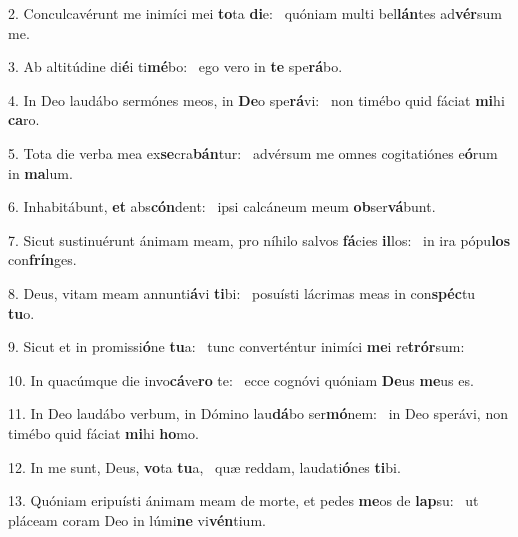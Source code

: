 2. Conculcavérunt me inimíci mei \textbf{to}ta \textbf{di}e: \ast\  quóniam multi bel\textbf{lán}tes ad\textbf{vér}sum me.\

3. Ab altitúdine di\textbf{é}i ti\textbf{mé}bo: \ast\  ego vero in \textbf{te} spe\textbf{rá}bo.\

4. In Deo laudábo sermónes meos, in \textbf{De}o spe\textbf{rá}vi: \ast\  non timébo quid fáciat \textbf{mi}hi \textbf{ca}ro.\

5. Tota die verba mea ex\textbf{se}cra\textbf{bán}tur: \ast\  advérsum me omnes cogitatiónes e\textbf{ó}rum in \textbf{ma}lum.\

6. Inhabitábunt, \textbf{et} abs\textbf{cón}dent: \ast\  ipsi calcáneum meum \textbf{ob}ser\textbf{vá}bunt.\

7. Sicut sustinuérunt ánimam meam, pro níhilo salvos \textbf{fá}cies \textbf{il}los: \ast\  in ira pópu\textbf{los} con\textbf{frín}ges.\

8. Deus, vitam meam annunti\textbf{á}vi \textbf{ti}bi: \ast\  posuísti lácrimas meas in con\textbf{spéc}tu \textbf{tu}o.\

9. Sicut et in promissi\textbf{ó}ne \textbf{tu}a: \ast\  tunc converténtur inimíci \textbf{me}i re\textbf{trór}sum:\

10. In quacúmque die invo\textbf{cá}ve\textbf{ro} te: \ast\  ecce cognóvi quóniam \textbf{De}us \textbf{me}us es.\

11. In Deo laudábo verbum, in Dómino lau\textbf{dá}bo ser\textbf{mó}nem: \ast\  in Deo sperávi, non timébo quid fáciat \textbf{mi}hi \textbf{ho}mo.\

12. In me sunt, Deus, \textbf{vo}ta \textbf{tu}a, \ast\  quæ reddam, laudati\textbf{ó}nes \textbf{ti}bi.\

13. Quóniam eripuísti ánimam meam de morte, et pedes \textbf{me}os de \textbf{lap}su: \ast\  ut pláceam coram Deo in lúmi\textbf{ne} vi\textbf{vén}tium.\

